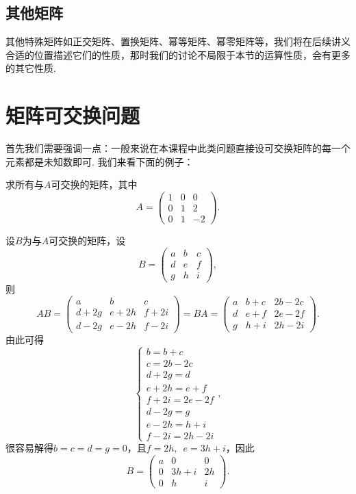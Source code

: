 \subsection{其他矩阵}

其他特殊矩阵如正交矩阵、置换矩阵、幂等矩阵、幂零矩阵等，我们将在后续讲义合适的位置描述它们的性质，那时我们的讨论不局限于本节的运算性质，会有更多的其它性质.

\section{矩阵可交换问题}

首先我们需要强调一点：一般来说在本课程中此类问题直接设可交换矩阵的每一个元素都是未知数即可. 我们来看下面的例子：
\begin{example}\label{ex:12:可交换矩阵1}
    求所有与$A$可交换的矩阵，其中
    \[A=\begin{pmatrix}
            1 & 0 & 0  \\
            0 & 1 & 2  \\
            0 & 1 & -2
        \end{pmatrix}.\]
\end{example}

\begin{solution}
    设$B$为与$A$可交换的矩阵，设
    \[B=\begin{pmatrix}
            a & b & c \\
            d & e & f \\
            g & h & i
        \end{pmatrix},\]
    则
    \[AB=\begin{pmatrix}
            a & b & c \\
            d+2g & e+2h & f+2i \\
            d-2g & e-2h & f-2i
        \end{pmatrix}=BA=\begin{pmatrix}
            a & b+c & 2b-2c \\
            d & e+f & 2e-2f \\
            g & h+i & 2h-2i
        \end{pmatrix}.\]
    由此可得
    \[\begin{cases}
        b=b+c \\
        c=2b-2c \\
        d+2g=d \\
        e+2h=e+f \\
        f+2i=2e-2f \\
        d-2g=g \\
        e-2h=h+i \\
        f-2i=2h-2i
    \end{cases},\]
    很容易解得$b=c=d=g=0$，且$f=2h,\enspace e=3h+i$，因此
    \[B=\begin{pmatrix}
            a & 0 & 0 \\
            0 & 3h+i & 2h \\
            0 & h & i
        \end{pmatrix}.\]
\end{solution}

